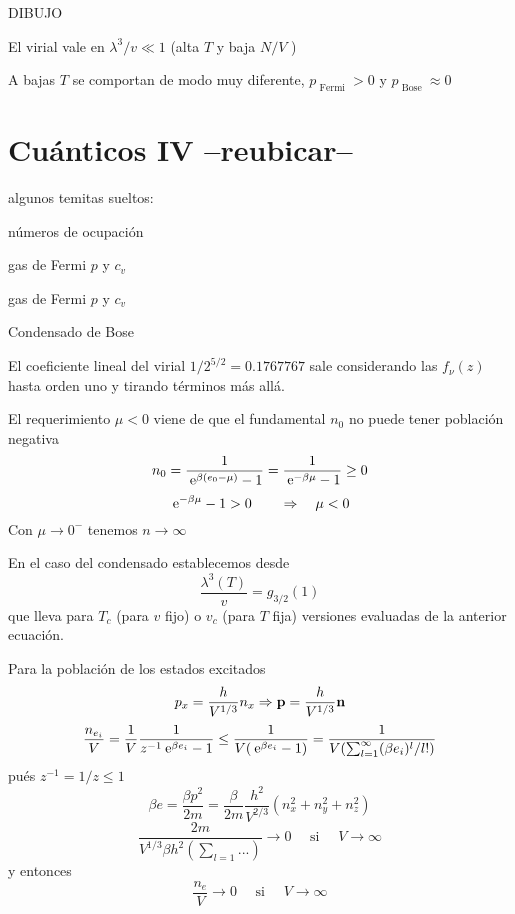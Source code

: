 \documentclass[10pt,oneside]{CBFT_book}
\begin{document}
DIBUJO 

El virial vale en $\lambda^3/v \ll 1$ (alta $T$ y baja $N/V$ )

A bajas $T$ se comportan de modo muy diferente, $p_{\text{ Fermi }} > 0 $ y
$p_{\text{ Bose }} \approx 0$

\section{Cuánticos IV --reubicar--}

algunos temitas sueltos:

números de ocupación

gas de Fermi $p$ y $c_v$

gas de Fermi $p$ y $c_v$

Condensado de Bose


El coeficiente lineal del virial $ 1/ 2^{5/2} = 0.1767767 $ sale considerando las $ f_{\nu}(z) $ hasta orden
uno y tirando términos más allá.


El requerimiento $ \mu < 0 $ viene de que el fundamental $ n_0 $ no puede tener población negativa
\[
	n_0 = \frac{1}{\:\mathrm{e}^{\beta(e_0 - \mu)} -1} = \frac{1}{\:\mathrm{e}^{-\beta\mu} -1} \geq 0
\]
\[
	\:\mathrm{e}^{-\beta\mu} -1 > 0 \qquad \Rightarrow \quad \mu < 0
\]
Con $\mu \to 0^-$ tenemos $ n \to \infty $

En el caso del condensado establecemos desde 
\[
	\frac{\lambda^3(T)}{v} = g_{3/2}(1) 
\]
que lleva para $T_c$ (para $v$ fijo) o $v_c$ (para $T$ fija) versiones evaluadas de la anterior ecuación.

Para la población de los estados excitados
\[
	p_x = \frac{h}{V^{1/3}}n_x \Rightarrow  \vb{p} = \frac{h}{V^{1/3}} \vb{n}
\]
\[
	\frac{n_{e_i}}{V} = \frac{1}{V} \frac{1}{ z^{-1}\:\mathrm{e}^{\beta e_i} - 1 } \leq 
	\frac{1}{V(\:\mathrm{e}^{\beta e_i} - 1)} = \frac{1}{V(\sum_{l=1}^\infty (\beta e_i )^l/l!)}
\]
pués $z^{-1} = 1/z \leq 1$
\[
	\beta e = \frac{\beta p^2}{2m} = \frac{\beta}{2m} \frac{h^2}{V^{2/3}} ( n_x^2 + n_y^2 + n_z^2)
\]
\[
	\frac{2m}{V^{1/3} \beta h^2 (\sum_{l=1} ... )} \to 0 \quad \text{ si } \quad V \to \infty
\]
y entonces
\[
	\frac{n_e}{V} \to 0 \quad \text{ si } \quad V \to \infty
\]
\end{document}
